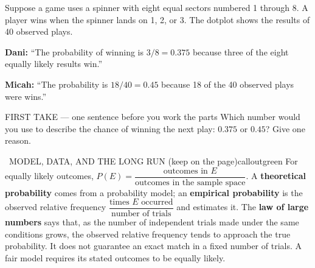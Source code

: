 \documentclass[11pt]{article}
\begin{document}
Suppose a game uses a spinner with eight equal sectors numbered 1 through 8. A player wins when the spinner lands on 1, 2, or 3. The dotplot shows the results of 40 observed plays.\par\smallskip \textbf{Dani:} ``The probability of winning is $3/8=0.375$ because three of the eight equally likely results win.''\par \textbf{Micah:} ``The probability is $18/40=0.45$ because 18 of the 40 observed plays were wins.''\par
\begin{center}
\end{center}
\begin{firsttakebox}{FIRST TAKE --- one sentence before you work the parts}
Which number would you use to describe the chance of winning the next play: $0.375$ or $0.45$? Give one reason.\par
{}
\end{firsttakebox}

\begin{callout}{\IconBook\ MODEL, DATA, AND THE LONG RUN (keep on the page)}{calloutgreen}
For equally likely outcomes, $P(E)=\dfrac{\text{outcomes in }E}{\text{outcomes in the sample space}}$.
A \textbf{theoretical probability} comes from a probability model; an \textbf{empirical probability}
is the observed relative frequency $\dfrac{\text{times }E\text{ occurred}}{\text{number of trials}}$ and estimates it.
The \textbf{law of large numbers} says that, as the number of independent trials made under the same
conditions grows, the observed relative frequency tends to approach the true probability. It does not
guarantee an exact match in a fixed number of trials. A fair model requires its stated outcomes to be equally likely.
\end{callout}
\end{document}
